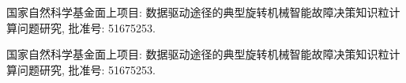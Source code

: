 \begin{appendixB}
	\begin{enumerate}[label={[\arabic*]}]
		\item 国家自然科学基金面上项目:  数据驱动途径的典型旋转机械智能故障决策知识粒计算问题研究,  批准号: 51675253. 
		\item 国家自然科学基金面上项目:  数据驱动途径的典型旋转机械智能故障决策知识粒计算问题研究,  批准号: 51675253.
	\end{enumerate}
\end{appendixB}
